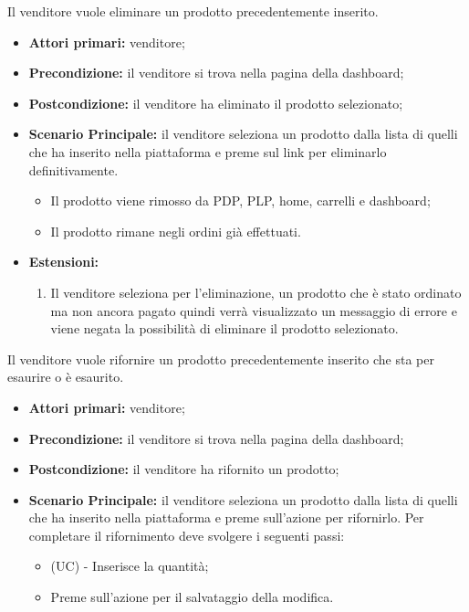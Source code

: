 Il venditore vuole eliminare un prodotto precedentemente inserito.
\begin{itemize}
    \item \textbf{Attori primari:} venditore;
    \item \textbf{Precondizione:} il venditore si trova nella pagina della dashboard;
    \item \textbf{Postcondizione:} il venditore ha eliminato il prodotto selezionato;
    \item \textbf{Scenario Principale:} il venditore seleziona un prodotto dalla lista di quelli che ha inserito nella piattaforma e preme sul link per eliminarlo definitivamente.
    \begin{itemize}
    \item Il prodotto viene rimosso da PDP, PLP, home, carrelli e dashboard;
    \item Il prodotto rimane negli ordini già effettuati.
    \end{itemize}
    \item \textbf{Estensioni:}
    \begin{enumerate}
    	\item Il venditore seleziona per l'eliminazione, un prodotto che è stato ordinato ma non ancora pagato quindi verrà visualizzato un messaggio di errore e viene negata la possibilità di eliminare il prodotto selezionato.
    \end{enumerate}
\end{itemize}

Il venditore vuole rifornire un prodotto precedentemente inserito che sta per esaurire o è esaurito.
\begin{itemize}
    \item \textbf{Attori primari:} venditore;
    \item \textbf{Precondizione:} il venditore si trova nella pagina della dashboard;
    \item \textbf{Postcondizione:} il venditore ha rifornito un prodotto;
    \item \textbf{Scenario Principale:} il venditore seleziona un prodotto dalla lista di quelli che ha inserito nella piattaforma e preme sull'azione per rifornirlo. Per completare il rifornimento deve svolgere i seguenti passi:
    \begin{itemize}
        \item (UC) - Inserisce la quantità;
        \item Preme sull'azione per il salvataggio della modifica.
    \end{itemize}
\end{itemize}